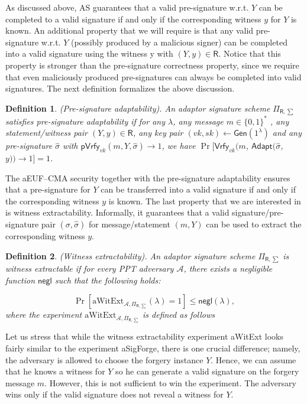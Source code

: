 \documentclass{llncs}
\newtheorem{Definition}{Definition}
\begin{document}
As discussed above, AS guarantees that a valid pre-signature w.r.t. $Y$ can be completed to a valid signature if and only if the corresponding witness $y$ for $Y$ is known. An additional property that we will require is that any valid pre-signature w.r.t. $Y$ (possibly produced by a malicious signer) can be completed into a valid signature using the witness y with $(Y, y) \in \mathsf{R}$. Notice that this property is stronger than the pre-signature correctness property, since we require that even maliciously produced pre-signatures can always be completed into valid signatures. The next definition formalizes the above discussion.

\begin{Definition}\emph{(Pre-signature adaptability).} An adaptor signature scheme $\Pi_{\mathsf{R},\sum}$ satisfies pre-signature adaptability if for any $\lambda$, any message $m \in \{0, 1\}^*$ , any statement/witness pair $(Y,y) \in \mathsf{R}$, any key pair $(vk,sk) \leftarrow \mathsf{Gen}(1^\lambda)$ and any pre-signature $\hat{\sigma}$ with $\mathsf{pVrfy}_{vk}(m,Y,\hat{\sigma})\rightarrow 1$, we have  $\Pr[\mathsf{Vrfy}_{vk}(m$, $\mathsf{Adapt}(\hat{\sigma}$, $y))\rightarrow 1] = 1$.
\end{Definition}

The aEUF–CMA security together with the pre-signature adaptability ensures that a pre-signature for $Y$ can be transferred into a valid signature if and only if the corresponding witness $y$ is known. The last property that we are interested in is witness extractability. Informally, it guarantees that a valid signature/pre-signature pair $(\sigma, \hat{\sigma})$ for message/statement $(m, Y)$ can be used to extract the corresponding witness $y$.


\begin{Definition}\emph{(Witness extractability).} An adaptor signature scheme $\Pi_{\mathsf{R},\sum}$ is witness extractable if for every PPT adversary $\mathcal{A}$, there exists a negligible function $\mathsf{negl}$ such that the following holds: 

$$\Pr[\text{aWitExt}_{\mathcal{A},\Pi_{\mathsf{R},\sum}}(\lambda) = 1] \leq \mathsf{negl}(\lambda),$$
where the experiment $\text{aWitExt}_{\mathcal{A},\Pi_{\mathsf{R},\sum}}$ is defined as follows
\end{Definition}

Let us stress that while the witness extractability experiment aWitExt looks fairly similar to the experiment aSigForge, there is one crucial difference; namely, the adversary is allowed to choose the forgery instance $Y$. Hence, we can assume that he knows a witness for $Y$ so he can generate a valid signature on the forgery message $m$. However, this is not sufficient to win the experiment. The adversary wins only if the valid signature does not reveal a witness for $Y$.
\end{document}
